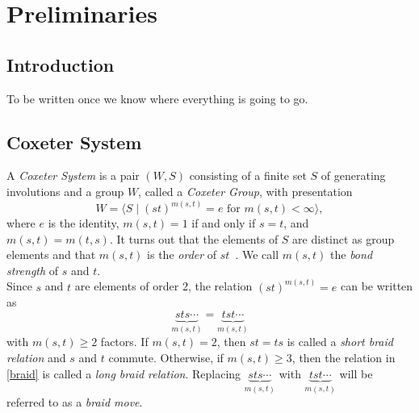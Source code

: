 \chapter{Preliminaries}

\section{Introduction}
To be written once we know where everything is going to go.


\section{Coxeter System}\label{sec:coxeter}
A \emph{Coxeter System} is a pair $(W,S)$ consisting of a finite set $S$ of generating involutions and a group $W$, called a \emph{Coxeter Group}, with presentation 
\[ 
W = \langle S \mid (st)^{m(s, t)} = e \text{ for } m(s, t) < \infty \rangle,
\]
where $e$ is the identity, $m(s,t) = 1$ if and only if $s = t$, and $m(s,t) = m(t,s)$. It turns out that the elements of $S$ are distinct as group elements and that $m(s,t)$ is the \emph\emph{order} of $st$~\cite{Humphreys1990}. We call $m(s,t)$ the \emph{bond strength} of $s$ and $t$.\\

Since $s$ and $t$ are elements of order 2, the relation $(st)^{m(s,t)}=e$ can be written as
\begin{equation}\label{braid} 
	\underbrace{sts \cdots}_{m(s,t)}=\underbrace{tst\cdots}_{m(s,t)}
\end{equation}
with $m(s,t) \geq 2$ factors. If $m(s,t)=2$, then $st=ts$ is called a \emph{short braid relation} and $s$ and $t$ commute. Otherwise, if $m(s,t) \geq 3$, then the relation in \eqref{braid} is called a \emph{long braid relation}. Replacing $\underbrace{sts\cdots}_{m(s,t)}$ with $\underbrace{tst\cdots}_{m(s,t)}$ will be referred to as a \emph{braid move}.\\

